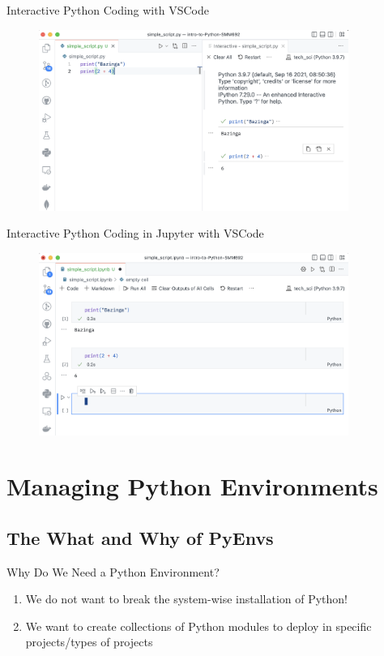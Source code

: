 \documentclass[aspectratio=1610]{beamer}
\begin{document}
\begin{frame}{Interactive Python Coding with VSCode}
		\begin{figure}
			\includegraphics[width=0.9\textwidth]{images/vscode}
		\end{figure}
\end{frame}

\begin{frame}{Interactive Python Coding in Jupyter with VSCode}
		\begin{figure}
			\includegraphics[width=0.9\textwidth]{images/jupyter_in_vscode}
		\end{figure}
\end{frame}

\section{Managing Python Environments}

\subsection{The What and Why of PyEnvs}

\begin{frame}[c]{Why Do We Need a Python Environment?}
	\begin{enumerate}
		\item We do not want to break the system-wise installation of Python!
		\item We want to create collections of Python modules to deploy in specific projects/types of projects 
	\end{enumerate}
\end{frame}
\end{document}

